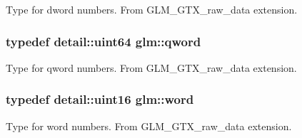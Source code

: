 Type for dword numbers. From GLM\_\-GTX\_\-raw\_\-data extension. \hypertarget{group__gtx__raw__data_g32447af289e879589883c9b7e3be1246}{
\subsubsection[qword]{\setlength{\rightskip}{0pt plus 5cm}typedef detail::uint64 {\bf glm::qword}}}
\label{group__gtx__raw__data_g32447af289e879589883c9b7e3be1246}


Type for qword numbers. From GLM\_\-GTX\_\-raw\_\-data extension. \hypertarget{group__gtx__raw__data_g5617a479d471021b5c773c5e969ba46d}{
\subsubsection[word]{\setlength{\rightskip}{0pt plus 5cm}typedef detail::uint16 {\bf glm::word}}}
\label{group__gtx__raw__data_g5617a479d471021b5c773c5e969ba46d}


Type for word numbers. From GLM\_\-GTX\_\-raw\_\-data extension. 